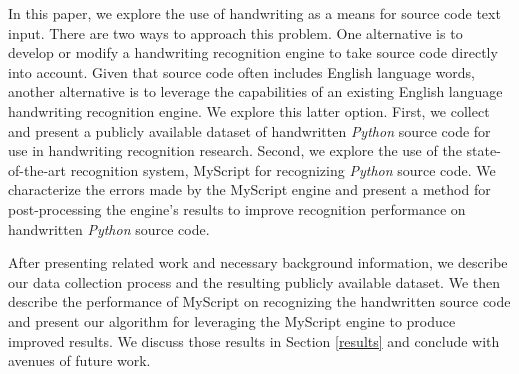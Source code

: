 \documentclass{vgtc}                          %
\begin{document}



In this paper, we explore the use of handwriting as a means for source code text input.  There are two ways to approach this problem.  One alternative is to develop or modify a handwriting recognition engine to take source code directly into account.  Given that source code often includes English language words, another alternative is to leverage the capabilities of an existing English language handwriting recognition engine. We explore this latter option.  First, we collect and present a publicly available dataset of handwritten \textit{Python} source code for use in handwriting recognition research.  Second, we explore the use of the state-of-the-art recognition system, MyScript \cite{myscript} for recognizing \textit{Python} source code.  We characterize the errors made by the MyScript engine and present a method for post-processing the engine's results to improve recognition performance on handwritten \textit{Python} source code.   

After presenting related work and necessary background information, we describe our data collection process and the resulting publicly available dataset. We then describe the performance of MyScript on recognizing the handwritten source code and present our algorithm for leveraging the MyScript engine to produce improved results.  We discuss those results in Section \ref{results} and conclude with avenues of future work.


\end{document}
